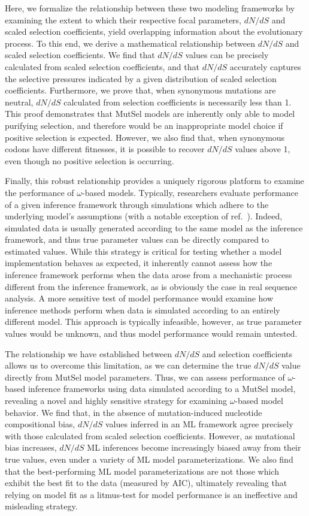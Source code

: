 \documentclass[11pt]{article}
\begin{document}
Here, we formalize the relationship between these two modeling frameworks by examining the extent to which their respective focal parameters, $dN/dS$ and scaled selection coefficients, yield overlapping information about the evolutionary process. To this end, we derive a mathematical relationship between $dN/dS$ and scaled selection coefficients. We find that $dN/dS$ values can be precisely calculated from scaled selection coefficients, and that $dN/dS$ accurately captures the selective pressures indicated by a given distribution of scaled selection coefficients. Furthermore, we prove that, when synonymous mutations are neutral, $dN/dS$ calculated from selection coefficients is necessarily less than 1. This proof demonstrates that MutSel models are inherently only able to model purifying selection, and therefore would be an inappropriate model choice if positive selection is expected. However, we also find that, when synonymous codons have different fitnesses, it is possible to recover $dN/dS$ values above 1, even though no positive selection is occurring. 

Finally, this robust relationship provides a uniquely rigorous platform to examine the performance of $\omega$-based models. Typically, researchers evaluate performance of a given inference framework through simulations which adhere to the underlying model's assumptions (with a notable exception of ref.\ \cite{Holder2008}). Indeed, simulated data is usually generated according to the same model as the inference framework, and thus true parameter values can be directly compared to estimated values. While this strategy is critical for testing whether a model implementation behaves as expected, it inherently cannot assess how the inference framework performs when the data arose from a mechanistic process different from the inference framework, as is obviously the case in real sequence analysis. A more sensitive test of model performance would examine how inference methods perform when data is simulated according to an entirely different model. This approach is typically infeasible, however, as true parameter values would be unknown, and thus model performance would remain untested. 

The relationship we have established between $dN/dS$ and selection coefficients allows us to overcome this limitation, as we can determine the true $dN/dS$ value directly from MutSel model parameters. Thus, we can assess performance of $\omega$-based inference frameworks using data simulated according to a MutSel model, revealing a novel and highly sensitive strategy for examining $\omega$-based model behavior. We find that, in the absence of mutation-induced nucleotide compositional bias, $dN/dS$ values inferred in an ML framework agree precisely with those calculated from scaled selection coefficients. However, as mutational bias increases, $dN/dS$ ML inferences become increasingly biased away from their true values, even under a variety of ML model parameterizations. We also find that the best-performing ML model parameterizations are not those which exhibit the best fit to the data (measured by AIC), ultimately revealing that relying on model fit as a litmus-test for model performance is an ineffective and misleading strategy. 
\end{document}
